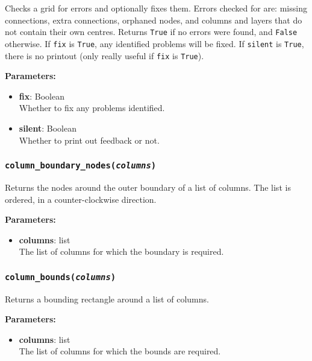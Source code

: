 Checks a grid for errors and optionally fixes them.  Errors checked for are: missing connections, extra connections, orphaned nodes, and columns and layers that do not contain their own centres.  Returns \texttt{True} if no errors were found, and \texttt{False} otherwise.  If \texttt{fix} is \texttt{True}, any identified problems will be fixed.  If \texttt{silent} is \texttt{True}, there is no printout (only really useful if \texttt{fix} is \texttt{True}).

\textbf{Parameters:}
\begin{itemize}
\item \textbf{fix}: Boolean\\
  Whether to fix any problems identified.
\item \textbf{silent}: Boolean\\
  Whether to print out feedback or not.
\end{itemize}

\begin{snugshade}\subsubsection{\texttt{column\_boundary\_nodes(\emph{columns})}}\end{snugshade}
\label{sec:mulgrid:column_boundary_nodes}

Returns the nodes around the outer boundary of a list of columns.  The list is ordered, in a counter-clockwise direction.

\textbf{Parameters:}
\begin{itemize}
\item \textbf{columns}: list\\
  The list of columns for which the boundary is required.
\end{itemize}

\begin{snugshade}\subsubsection{\texttt{column\_bounds(\emph{columns})}}\end{snugshade}
\label{sec:mulgrid:column_bounds}

Returns a bounding rectangle around a list of columns.

\textbf{Parameters:}
\begin{itemize}
\item \textbf{columns}: list\\
  The list of columns for which the bounds are required.
\end{itemize}

